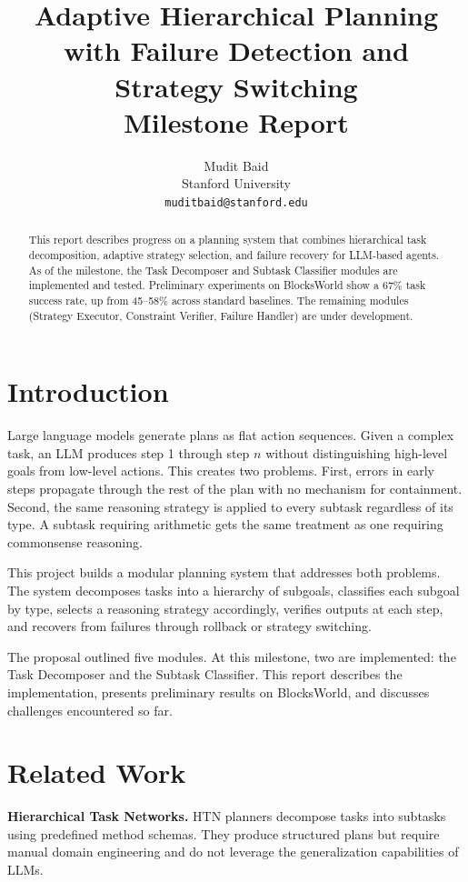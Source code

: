 \documentclass{article}
\title{Adaptive Hierarchical Planning with Failure Detection and Strategy Switching \\ \large Milestone Report}
\author{Mudit Baid \\ Stanford University \\ \texttt{muditbaid@stanford.edu}}
\date{}
\begin{document}
\maketitle

\begin{abstract}
This report describes progress on a planning system that combines hierarchical task decomposition, adaptive strategy selection, and failure recovery for LLM-based agents. As of the milestone, the Task Decomposer and Subtask Classifier modules are implemented and tested. Preliminary experiments on BlocksWorld show a 67\% task success rate, up from 45--58\% across standard baselines. The remaining modules (Strategy Executor, Constraint Verifier, Failure Handler) are under development.
\end{abstract}

\section{Introduction}

Large language models generate plans as flat action sequences. Given a complex task, an LLM produces step 1 through step $n$ without distinguishing high-level goals from low-level actions. This creates two problems. First, errors in early steps propagate through the rest of the plan with no mechanism for containment. Second, the same reasoning strategy is applied to every subtask regardless of its type. A subtask requiring arithmetic gets the same treatment as one requiring commonsense reasoning.

This project builds a modular planning system that addresses both problems. The system decomposes tasks into a hierarchy of subgoals, classifies each subgoal by type, selects a reasoning strategy accordingly, verifies outputs at each step, and recovers from failures through rollback or strategy switching.

The proposal outlined five modules. At this milestone, two are implemented: the Task Decomposer and the Subtask Classifier. This report describes the implementation, presents preliminary results on BlocksWorld, and discusses challenges encountered so far.

\section{Related Work}

\textbf{Hierarchical Task Networks.} HTN planners \citep{erol1994htn} decompose tasks into subtasks using predefined method schemas. They produce structured plans but require manual domain engineering and do not leverage the generalization capabilities of LLMs.
\end{document}
